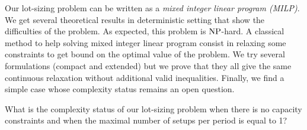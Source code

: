 Our lot-sizing problem can be written as a \emph{mixed integer linear program (MILP)}.
We get several theoretical results in deterministic setting that show the difficulties of the problem.
As expected, this problem is $\operatorname{NP}$-hard.
A classical method to help solving mixed integer linear program consist in relaxing some constraints to get bound on the optimal value of the problem.
We try several formulations (compact and extended) but we prove that they all give the same continuous relaxation without additional valid inequalities.
Finally, we find a simple case whose complexity status remains an open question.
\begin{question}
What is the complexity status of our lot-sizing problem when there is no capacity constraints and when the maximal number of setups per period is equal to 1?
\end{question}


